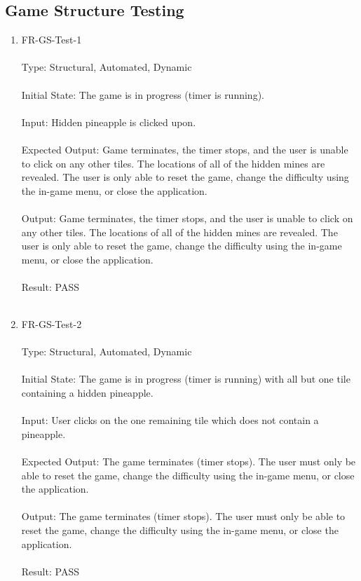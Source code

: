 \documentclass[12pt, titlepage]{article}
\begin{document}
\subsection{Game Structure Testing}
\begin{enumerate}

\item{FR-GS-Test-1\\\\}
Type: Structural, Automated, Dynamic\\\\				
Initial State: The game is in progress (timer is running).\\\\
Input: Hidden pineapple is clicked upon.\\\\					
Expected Output: Game terminates, the timer stops, and the user is unable to click on any other tiles. The locations of
all of the hidden mines are revealed. The user is only able to reset the game, change the difficulty using the in-game menu,
or close the application.\\\\
Output: Game terminates, the timer stops, and the user is unable to click on any other tiles. The locations of all of the hidden
mines are revealed. The user is only able to reset the game, change the difficulty using the in-game menu, or close the application.\\\\
Result: PASS\\\\

\newpage
\item{FR-GS-Test-2\\\\}
Type: Structural, Automated, Dynamic\\\\			
Initial State: The game is in progress (timer is running) with all but one tile containing a hidden pineapple.\\\\
Input: User clicks on the one remaining tile which does not contain a pineapple.\\\\				
Expected Output: The game terminates (timer stops). The user must only be able to reset the game, change the
difficulty using the in-game menu, or close the application.\\\\
Output: The game terminates (timer stops). The user must only be able to reset the game, change the difficulty
using the in-game menu, or close the application.\\\\
Result: PASS\\\\


\end{enumerate}
\end{document}
